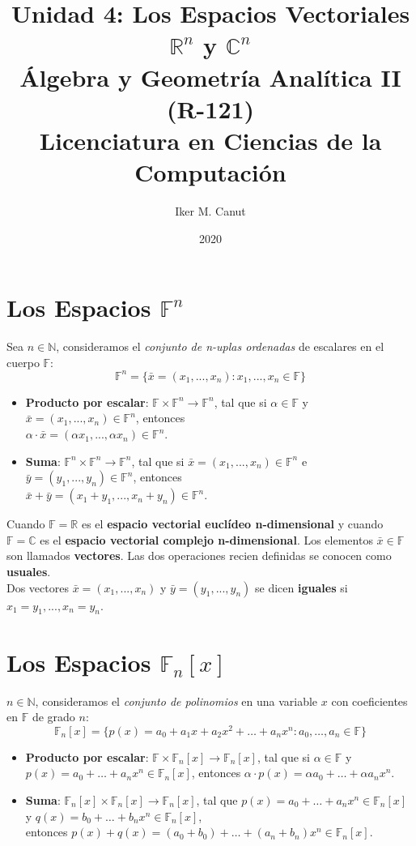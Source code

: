 \documentclass[11pt,a4paper]{article}
\author{Iker M. Canut}
\title{Unidad 4: Los Espacios Vectoriales $\mathbb{R}^n$ y $\mathbb{C}^n$\\ \'Algebra y Geometr\'ia Anal\'itica II (R-121)\\Licenciatura en Ciencias de la Computaci\'on}
\date{2020}
\begin{document}
\maketitle
\newpage

\section{Los Espacios $\mathbb{F}^n$}
Sea $n \in \mathbb{N}$, consideramos el \textit{conjunto de n-uplas ordenadas} de escalares en el cuerpo $\mathbb{F}$:
$$\mathbb{F}^n = \{ \bar{x} = (x_1, ..., x_n) : x_1,...,x_n \in \mathbb{F}\}$$
\begin{itemize}
\itemsep-0.3em
\item \textbf{Producto por escalar}: $\mathbb{F} \times \mathbb{F}^n \rightarrow \mathbb{F}^n$, tal que si $\alpha \in \mathbb{F}$ y $\bar{x} = (x_1,...,x_n) \in \mathbb{F}^n$, entonces\\
$\alpha \cdot \bar{x} = (\alpha x_1,..., \alpha x_n) \in \mathbb{F}^n$.
\item \textbf{Suma}: $\mathbb{F}^n \times \mathbb{F}^n \rightarrow \mathbb{F}^n$, tal que si $\bar{x} = (x_1,...,x_n) \in \mathbb{F}^n$ e $\bar{y} = (y_1,...,y_n) \in \mathbb{F}^n$, entonces\\
$\bar{x} + \bar{y} = (x_1 + y_1,..., x_n + y_n) \in \mathbb{F}^n$.
\end{itemize}

Cuando $\mathbb{F} = \mathbb{R}$ es el \textbf{espacio vectorial eucl\'ideo n-dimensional} y cuando $\mathbb{F} = \mathbb{C}$ es el \textbf{espacio vectorial complejo n-dimensional}. Los elementos $\bar{x} \in \mathbb{F}$ son llamados \textbf{vectores}. Las dos operaciones recien definidas se conocen como \textbf{usuales}.\\

Dos vectores $\bar{x} = (x_1,...,x_n)$ y $\bar{y} = (y_1,...,y_n)$ se dicen \textbf{iguales} si $x_1=y_1, ..., x_n=y_n$. 

\section{Los Espacios $\mathbb{F}_n[x]$}
$n \in \mathbb{N}$, consideramos el \textit{conjunto de polinomios} en una variable $x$ con coeficientes en $\mathbb{F}$ de grado $n$:
$$\mathbb{F}_n[x] = \{ p(x) = a_0 + a_1 x + a_2 x^2 + \hdots + a_n x^n : a_0,\hdots,a_n \in \mathbb{F} \}$$
\begin{itemize}
\itemsep-0.3em
\item \textbf{Producto por escalar}: $\mathbb{F} \times \mathbb{F}_n[x] \rightarrow \mathbb{F}_n[x]$, tal que si $\alpha \in \mathbb{F}$ y $p(x) = a_0 + \hdots + a_n x^n \in \mathbb{F}_n[x]$, entonces $\alpha \cdot p(x) = \alpha a_0 + \hdots + \alpha a_n x^n$.
\item \textbf{Suma}: $\mathbb{F}_n[x] \times \mathbb{F}_n[x] \rightarrow \mathbb{F}_n[x]$, {\footnotesize{tal que}} $p(x) = a_0 + \hdots + a_n x^n \in \mathbb{F}_n[x]$ y $q(x) = b_0 + \hdots + b_n x^n \in \mathbb{F}_n[x]$,\\ entonces
$p(x) + q(x) = (a_0 + b_0) + \hdots + (a_n + b_n) x^n \in \mathbb{F}_n[x]$.
\end{itemize}
\end{document}
